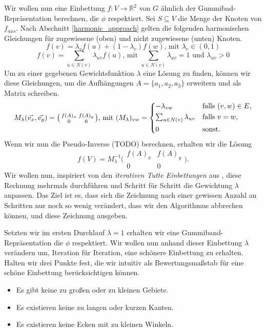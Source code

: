 Wir wollen nun eine Einbettung $f:V\to \mathbb{R}^2$ von $G$ ähnlich der Gummibad-Repräsentation berechnen, die $\phi$ respektiert. Sei $S \subseteq V$ die Menge der Knoten von $f_{aus}$. Nach Abschnitt \ref{harmonic_approach} gelten die folgenden harmonischen Gleichungen für zugewiesene (oben) und nicht zugewiesene (unten) Knoten.
$$ f(v) = \lambda_v f(u) + (1-\lambda_v)f(w) \text{, mit } \lambda_v \in (0,1) $$
$$ f(v) = \sum_{u \in N(v)} \lambda_{uv} f(u) \text{, mit }  \sum_{u \in N(v)}\lambda_{uv} = 1 \text{ und } \lambda_{uv} > 0 $$
Um zu einer gegebenen Gewichtsfunktion $\lambda$ eine Lösung zu finden, können wir diese Gleichungen, um die Aufhängungen $A = \{a_1,a_2,a_3\}$ erweitern und als Matrix schreiben.
\[ M_{\lambda}(\vec{v_x},\vec{v_y}) = \big( \begin{smallmatrix}f(A)_x&f(A)_y\\ 0&0\end{smallmatrix} \big) \text{, mit } (M_{\lambda})_{vw} =
	\begin{dcases}
	-\lambda_{vw} & \text{falls } (v,w) \in E, \\
	\textstyle\sum_{u \in N(v)} \lambda_{uv} & \text{falls } v = w, \\
	0 & \text{sonst.} \\
	\end{dcases}
\]
Wenn wir nun die Pseudo-Inverse (TODO) berechnen, erhalten wir die Lösung
$$f(V) = M_{\lambda}^{-1}\big( \begin{smallmatrix}f(A)_x&f(A)_y\\ 0&0\end{smallmatrix} \big).$$
Wir wollen nun, inspiriert von den \textit{iterativen Tutte Einbettungen} aus \cite{fs17}, diese Rechnung mehrmals durchführen und Schritt für Schritt die Gewichtung $\lambda$ anpassen. Das Ziel ist es, dass sich die Zeichnung nach einer gewissen Anzahl an Schritten nur noch so wenig verändert, dass wir den Algorithmus abbrechen können, und diese Zeichnung ausgeben.

Setzten wir im ersten Durchlauf $\lambda = 1$ erhalten wir eine Gummiband-Repräsentation die $\phi$ respektiert. Wir wollen nun anhand dieser Einbettung $\lambda$ verändern um, Iteration für Iteration, eine \glqq schönere\grqq{ } Einbettung zu erhalten. Halten wir drei Punkte fest, die wir intuitiv als Bewertungsmaßstab für eine schöne Einbettung berücksichtigen können.
\begin{itemize}
\item Es gibt keine zu großen oder zu kleinen Gebiete.
\item Es existieren keine zu langen oder kurzen Kanten.
\item Es existieren keine Ecken mit zu kleinen Winkeln.
\end{itemize}

